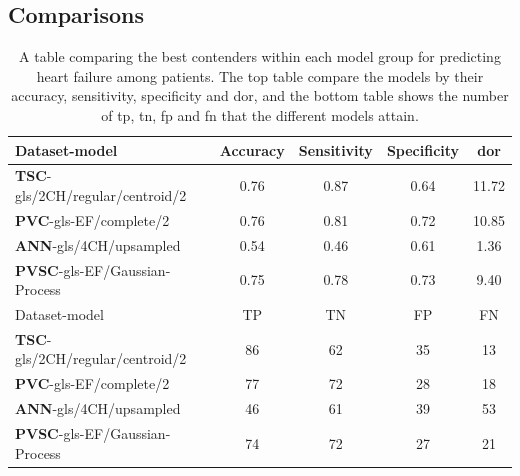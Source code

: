 \clearpage
\subsection{Comparisons}

\begin{table}
    \centering
    \begin{tabular}{lcccc}
        \toprule
        Dataset-model                           &  Accuracy &  Sensitivity &  Specificity &  \acrshort{dor} \\
        \midrule
        \textbf{TSC}-gls/2CH/regular/centroid/2 &      0.76 &         0.87 &         0.64 & 11.72 \\
        \textbf{PVC}-gls-EF/complete/2          &      0.76 &         0.81 &         0.72 & 10.85 \\
        \textbf{ANN}-gls/4CH/upsampled          &      0.54 &         0.46 &         0.61 & 1.36 \\
        \textbf{PVSC}-gls-EF/Gaussian-Process   &      0.75 &         0.78 &         0.73 & 9.40 \\
        \midrule
        Dataset-model                           &  TP &  TN &  FP &  FN \\
        \midrule
        \textbf{TSC}-gls/2CH/regular/centroid/2 &  86 &  62 &  35 &  13 \\
        \textbf{PVC}-gls-EF/complete/2          &  77 &  72 &  28 &  18 \\
        \textbf{ANN}-gls/4CH/upsampled          &  46 &  61 &  39 &  53 \\
        \textbf{PVSC}-gls-EF/Gaussian-Process   &  74 &  72 &  27 &  21 \\
        \bottomrule
    \end{tabular}
    \caption{A table comparing the best contenders within each model group for predicting heart failure among patients. The top table compare the models by their accuracy, sensitivity, specificity and \acrshort{dor}, and the bottom table shows the number of \acrshort{tp}, \acrshort{tn}, \acrshort{fp} and \acrshort{fn} that the different models attain.}
    \label{tab:hf_compare}
\end{table}

